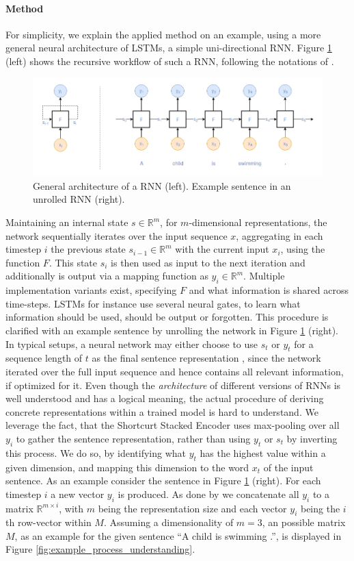 \paragraph*{Method}\label{sec:understanding1_method}
For simplicity, we explain the applied method on an example, using a more general neural architecture of \ac{LSTM}s, a simple uni-directional \ac{RNN}.
Figure \ref{fig:rnn} (left) shows the recursive workflow of such a \ac{RNN}, following the notations of \cite{goldberg2017Apr}.
\begin{figure}[tph!]
\centering
	\includegraphics[totalheight=5.5cm]{fig/rnn.png}
	\caption{General architecture of a \ac{RNN} (left). Example sentence in an unrolled \ac{RNN} (right).}
	\label{fig:rnn}
\end{figure}
Maintaining an internal state $s \in \mathbb{R}^m$, for $m$-dimensional representations, the network sequentially iterates over the input sequence $x$, aggregating in each timestep $i$ the previous state $s_{i-1} \in \mathbb{R}^m$ with the current input $x_i$, using the function $F$. This state $s_i$ is then used as input to the next iteration and additionally is output via a mapping function as $y_i \in \mathbb{R}^m$. Multiple implementation variants exist, specifying $F$ and what information is shared across time-steps. \ac{LSTM}s for instance use several neural gates, to learn what information should be used, should be output or forgotten. This procedure is clarified with an example sentence by unrolling the network in Figure \ref{fig:rnn} (right). In typical setups, a neural network may either choose to use $s_t$ or $y_t$ for a sequence length of $t$ as the final sentence representation \citep{goldberg2017Apr}, since the network iterated over the full input sequence and hence contains all relevant information, if optimized for it. Even though the \textit{architecture} of different versions of \ac{RNN}s is well understood and has a logical meaning, the actual procedure of deriving concrete representations within a trained model is hard to understand. We leverage the fact, that the Shortcurt Stacked Encoder uses max-pooling over all $y_i$ to gather the sentence representation, rather than using $y_t$ or $s_t$ by inverting this process. We do so, by identifying what $y_t$ has the highest value within a given dimension, and mapping this dimension to the word $x_t$ of the input sentence. As an example consider the sentence in Figure \ref{fig:rnn} (right). For each timestep $i$ a new vector $y_i$ is produced. As done by \cite{nie2017shortcut} we concatenate all $y_i$ to a matrix $\mathbb{R}^{m \times i}$, with $m$ being the representation size and each vector $y_i$ being the $i$th row-vector within $M$. Assuming a dimensionality of $m = 3$, an possible matrix $M$, as an example for the given sentence ``A child is swimming .'', is displayed in Figure \ref{fig:example_process_understanding}. 
